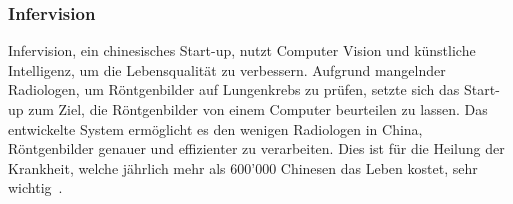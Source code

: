 \subsubsection{Infervision}

Infervision, ein chinesisches Start-up, nutzt Computer Vision und künstliche Intelligenz, um die Lebensqualität zu verbessern. Aufgrund mangelnder Radiologen, um Röntgenbilder auf Lungenkrebs zu prüfen, setzte sich das Start-up zum Ziel, die Röntgenbilder von einem Computer beurteilen zu lassen. Das entwickelte System ermöglicht es den wenigen Radiologen in China, Röntgenbilder genauer und effizienter zu verarbeiten. Dies ist für die Heilung der Krankheit, welche jährlich mehr als 600'000 Chinesen das Leben kostet, sehr wichtig~\autocite{Infervision}.











